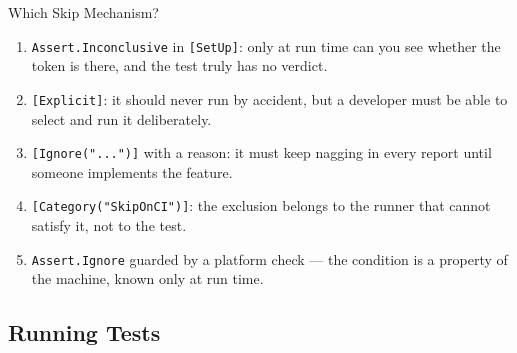 \begin{solutionframe}{Which Skip Mechanism?}
  \begin{enumerate}
    \item \texttt{Assert.Inconclusive} in \texttt{[SetUp]}: only at run time can
      you see whether the token is there, and the test truly has no verdict.
    \item \texttt{[Explicit]}: it should never run by accident, but a developer
      must be able to select and run it deliberately.
    \item \texttt{[Ignore("...")]} with a reason: it must keep nagging in every
      report until someone implements the feature.
    \item \texttt{[Category("SkipOnCI")]}: the exclusion belongs to the runner
      that cannot satisfy it, not to the test.
    \item \texttt{Assert.Ignore} guarded by a platform check --- the condition
      is a property of the machine, known only at run time.
  \end{enumerate}
  \vspace{2ex}

\end{solutionframe}

\subsection{Running Tests}

